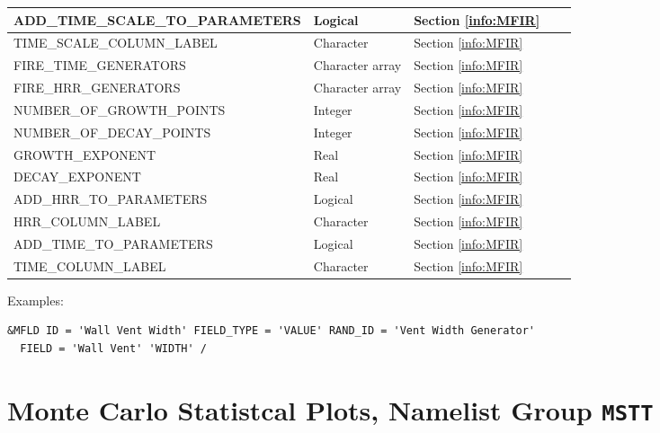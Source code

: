\begin{landscape}
\begin{longtable}{|l|l|l|l|l|}
{\ct ADD\_TIME\_SCALE\_TO\_PARAMETERS}                      & Logical           & Section \ref{info:MFIR}   &      &     \\ \hline
{\ct TIME\_SCALE\_COLUMN\_LABEL}                            & Character         & Section \ref{info:MFIR}   &      &     \\ \hline \hline
{\ct FIRE\_TIME\_GENERATORS}                                & Character array   & Section \ref{info:MFIR}   &      &     \\ \hline
{\ct FIRE\_HRR\_GENERATORS}                                 & Character array   & Section \ref{info:MFIR}   &      &     \\ \hline
{\ct NUMBER\_OF\_GROWTH\_POINTS}                            & Integer           & Section \ref{info:MFIR}   &      &     \\ \hline
{\ct NUMBER\_OF\_DECAY\_POINTS}                             & Integer           & Section \ref{info:MFIR}   &      &     \\ \hline
{\ct GROWTH\_EXPONENT}                                      & Real              & Section \ref{info:MFIR}   &      &     \\ \hline
{\ct DECAY\_EXPONENT}                                       & Real              & Section \ref{info:MFIR}   &      &     \\ \hline
{\ct ADD\_HRR\_TO\_PARAMETERS}                              & Logical           & Section \ref{info:MFIR}   &      &     \\ \hline
{\ct HRR\_COLUMN\_LABEL}                                    & Character         & Section \ref{info:MFIR}   &      &     \\ \hline
{\ct ADD\_TIME\_TO\_PARAMETERS}                             & Logical           & Section \ref{info:MFIR}   &      &     \\ \hline
{\ct TIME\_COLUMN\_LABEL}                                   & Character         & Section \ref{info:MFIR}   &      &     \\ \hline


\end{longtable}
\end{landscape}
\noindent Examples:
\begin{lstlisting}
&MFLD ID = 'Wall Vent Width' FIELD_TYPE = 'VALUE' RAND_ID = 'Vent Width Generator'
  FIELD = 'Wall Vent' 'WIDTH' /
\end{lstlisting}


\clearpage

\section{Monte Carlo Statistcal Plots, Namelist Group \texorpdfstring{{\tt MSTT}}{MSTT}}


